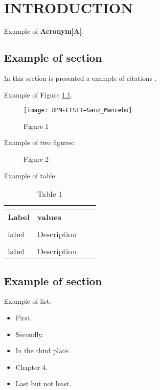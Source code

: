\setcounter{chapter}{0}
\chapter{INTRODUCTION}
Example of \textbf{Acronym[\acs{A}]}. 

\section{Example of section} 
In this section is presented a example of citations \cite{article}.

Example of Figure \ref{fig:figure1}. 
\begin{figure}[H]
	\centering
	{\texttt{[image: UPM-ETSIT--Sanz\_Mancebo]} }
	\caption{Figure 1}%
	\label{fig:figure1}
\end{figure}
Example of two figures:
\begin{figure}[h!]
	\centering
	 \label{fig:subfigure1}
	\qquad
	 \label{fig:subfigure2}
	\caption{Figure 2}%
	\label{fig:figure2}
\end{figure}

Example of table:
\begin{table}[H]
	\begin{center} {\footnotesize
			\begin{tabularx}{\textwidth}{@{} lXlX @{} }
				\multicolumn{2}{c}{} \\ 
				\hline
				
				\normalsize \textbf{Label} & \normalsize \textbf{values} \\

				\hline
				& \\
				label  & Description\\
				& \\
				label  & Description\\
				\hline
		\end{tabularx}}
	\end{center}
	\caption{\footnotesize Table 1}
	\label{table1}
\end{table}

\section{Example of section}
Example of list:
\renewcommand\labelitemi{\ding{117}}
\begin{itemize}
	\item First.
	\item Secondly.
	\item In the third place.
	\item Chapter 4.
	\item Last but not least.

\end{itemize}